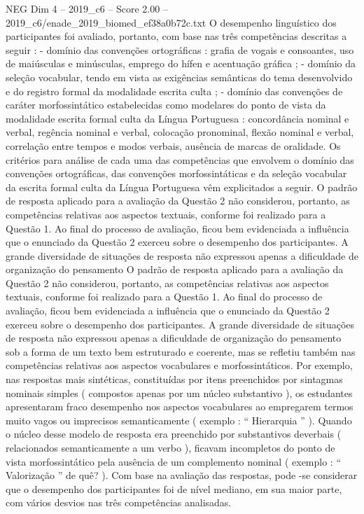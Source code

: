 \begin{textsample}{NEG Dim 4 – 2019\_c6 – Score 2.00 – 2019\_c6/enade\_2019\_biomed\_ef38a0b72c.txt}
O desempenho linguístico dos participantes foi avaliado, portanto, com base nas três competências descritas a seguir : - domínio das convenções ortográficas : grafia de vogais e consoantes, uso de maiúsculas e minúsculas, emprego do hífen e acentuação gráfica ; - domínio da seleção vocabular, tendo em vista as exigências semânticas do tema desenvolvido e do registro formal da modalidade escrita culta ; - domínio das convenções de caráter morfossintático estabelecidas como modelares do ponto de vista da modalidade escrita formal culta da Língua Portuguesa : concordância nominal e verbal, regência nominal e verbal, colocação pronominal, flexão nominal e verbal, correlação entre tempos e modos verbais, ausência de marcas de oralidade.
Os critérios para análise de cada uma das competências que envolvem o domínio das convenções ortográficas, das convenções morfossintáticas e da seleção vocabular da escrita formal culta da Língua Portuguesa vêm explicitados a seguir.
O padrão de resposta aplicado para a avaliação da Questão 2 não considerou, portanto, as competências relativas aos aspectos textuais, conforme foi realizado para a Questão 1.
Ao final do processo de avaliação, ficou bem evidenciada a influência que o enunciado da Questão 2 exerceu sobre o desempenho dos participantes.
A grande diversidade de situações de resposta não expressou apenas a dificuldade de organização do pensamento O padrão de resposta aplicado para a avaliação da Questão 2 não considerou, portanto, as competências relativas aos aspectos textuais, conforme foi realizado para a Questão 1.
Ao final do processo de avaliação, ficou bem evidenciada a influência que o enunciado da Questão 2 exerceu sobre o desempenho dos participantes.
A grande diversidade de situações de resposta não expressou apenas a dificuldade de organização do pensamento sob a forma de um texto bem estruturado e coerente, mas se refletiu também nas competências relativas aos aspectos vocabulares e morfossintáticos.
Por exemplo, nas respostas mais sintéticas, constituídas por itens preenchidos por sintagmas nominais simples ( compostos apenas por um núcleo substantivo ), os estudantes apresentaram fraco desempenho nos aspectos vocabulares ao empregarem termos muito vagos ou imprecisos semanticamente ( exemplo : “ Hierarquia ” ).
Quando o núcleo desse modelo de resposta era preenchido por substantivos deverbais ( relacionados semanticamente a um verbo ), ficavam incompletos do ponto de vista morfossintático pela ausência de um complemento nominal ( exemplo : “ Valorização ” de quê? ).
Com base na avaliação das respostas, pode -se considerar que o desempenho dos participantes foi de nível mediano, em sua maior parte, com vários desvios nas três competências analisadas.

\end{textsample}
